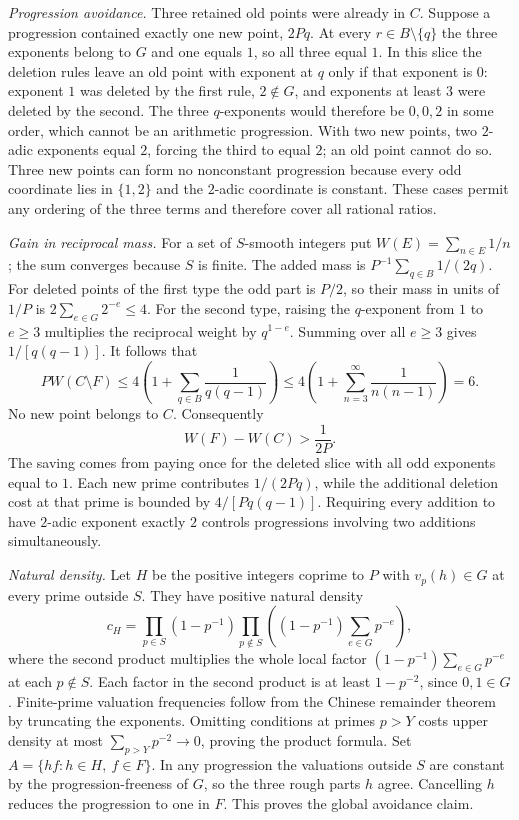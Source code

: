 \medskip\noindent\textit{Progression avoidance.}
Three retained old points were already in $C$. Suppose a progression
contained exactly one new point, $2Pq$. At every $r\in B\setminus\{q\}$
the three exponents belong to $G$ and one equals $1$, so all three equal
$1$. In this slice the deletion rules leave an old point with exponent
at $q$ only if that exponent is $0$: exponent $1$ was deleted by the
first rule, $2\notin G$, and exponents at least $3$ were deleted by the
second. The three $q$-exponents would therefore be $0,0,2$ in some
order, which cannot be an arithmetic progression. With two new points,
two $2$-adic exponents equal $2$, forcing the third to equal $2$;
an old point cannot do so. Three new points can form no nonconstant
progression because every odd coordinate lies in $\{1,2\}$ and the
$2$-adic coordinate is constant. These cases permit any ordering of the
three terms and therefore cover all rational ratios.

\medskip\noindent\textit{Gain in reciprocal mass.}
For a set of $S$-smooth integers put $W(E)=\sum_{n\in E}1/n$;
the sum converges because $S$ is finite.
The added mass is $P^{-1}\sum_{q\in B}1/(2q)$.
For deleted points of the first type the odd part is $P/2$,
so their mass in units of $1/P$ is
$2\sum_{e\in G}2^{-e}\le4$. For the second type, raising the
$q$-exponent from $1$ to $e\ge3$ multiplies the reciprocal weight
by $q^{1-e}$. Summing over all $e\ge3$ gives $1/[q(q-1)]$.
It follows that
\[
 P W(C\setminus F)
 \le 4\left(1+\sum_{q\in B}\frac{1}{q(q-1)}\right)
 \le 4\left(1+\sum_{n=3}^\infty\frac{1}{n(n-1)}\right)=6.
\]
No new point belongs to $C$. Consequently
\[
                 W(F)-W(C)>\frac{1}{2P}.
\]
The saving comes from paying once for the deleted slice with all odd
exponents equal to $1$. Each new prime contributes $1/(2Pq)$, while
the additional deletion cost at that prime is bounded by
$4/[Pq(q-1)]$. Requiring every addition to have $2$-adic exponent
exactly $2$ controls progressions involving two additions simultaneously.

\medskip\noindent\textit{Natural density.}
Let $H$ be the positive integers coprime to $P$ with $v_p(h)\in G$
at every prime outside $S$. They have positive natural density
\[
 c_H=\prod_{p\in S}(1-p^{-1})
      \prod_{p\notin S}\left((1-p^{-1})\sum_{e\in G}p^{-e}\right),
\]
where the second product multiplies the whole local factor
$(1-p^{-1})\sum_{e\in G}p^{-e}$ at each $p\notin S$.
Each factor in the second product is at least $1-p^{-2}$, since $0,1\in G$.
Finite-prime valuation frequencies follow from the Chinese remainder
theorem by truncating the exponents. Omitting conditions at primes
$p>Y$ costs upper density at most $\sum_{p>Y}p^{-2}\to0$, proving the
product formula. Set $A=\{hf:h\in H,\ f\in F\}$. In any progression
the valuations outside $S$ are constant by the progression-freeness of
$G$, so the three rough parts $h$ agree. Cancelling $h$ reduces the
progression to one in $F$. This proves the global avoidance claim.

